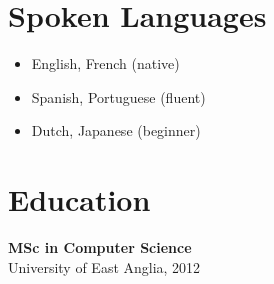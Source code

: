 \documentclass[a4paper,10pt]{article}
\begin{document}
{\begin{minipage}[t]{0.32\textwidth}
{\begin{minipage}[t][\textheight]{\dimexpr\textwidth-10pt}
        \section*{\color{lightblue} Spoken Languages}
        \begin{itemize}[leftmargin=1em, nosep]
            \item English, French (native)
            \item Spanish, Portuguese (fluent)
            \item Dutch, Japanese (beginner)
        \end{itemize}

        \section*{\color{lightblue} Education}
        \textbf{MSc in Computer Science} \\
        University of East Anglia, 2012
        \vfill %
    \end{minipage}%
    }
\end{minipage}%
\vfill %
}%
\end{document}
